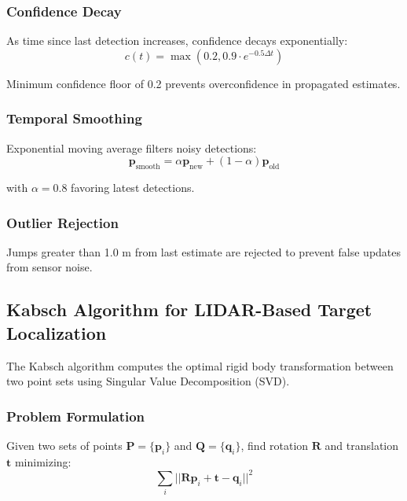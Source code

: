 \documentclass[11pt,a4paper]{article}
\begin{document}
\subsubsection{Confidence Decay}

As time since last detection increases, confidence decays exponentially:
\begin{equation}
c(t) = \max(0.2, 0.9 \cdot e^{-0.5 \Delta t})
\end{equation}

Minimum confidence floor of 0.2 prevents overconfidence in propagated estimates.

\subsubsection{Temporal Smoothing}

Exponential moving average filters noisy detections:
\begin{equation}
\mathbf{p}_{\text{smooth}} = \alpha \mathbf{p}_{\text{new}} + (1 - \alpha) \mathbf{p}_{\text{old}}
\end{equation}

with $\alpha = 0.8$ favoring latest detections.

\subsubsection{Outlier Rejection}

Jumps greater than 1.0 m from last estimate are rejected to prevent false updates from sensor noise.

\subsection{Kabsch Algorithm for LIDAR-Based Target Localization}

The Kabsch algorithm computes the optimal rigid body transformation between two point sets using Singular Value Decomposition (SVD).

\subsubsection{Problem Formulation}

Given two sets of points $\mathbf{P} = \{\mathbf{p}_i\}$ and $\mathbf{Q} = \{\mathbf{q}_i\}$, find rotation $\mathbf{R}$ and translation $\mathbf{t}$ minimizing:
\begin{equation}
\sum_i ||\mathbf{R}\mathbf{p}_i + \mathbf{t} - \mathbf{q}_i||^2
\end{equation}
\end{document}
